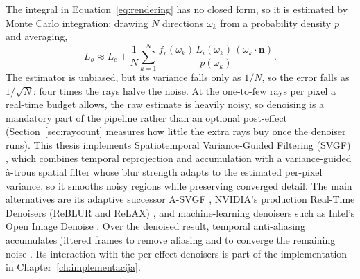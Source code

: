 The integral in Equation~\eqref{eq:rendering} has no closed form, so it is estimated by Monte Carlo
integration: drawing $N$ directions $\omega_k$ from a probability density $p$ and averaging,
\begin{equation}
L_o \approx L_e + \frac{1}{N}\sum_{k=1}^{N}
\frac{f_r(\omega_k)\, L_i(\omega_k)\, (\omega_k \cdot \mathbf{n})}{p(\omega_k)}.
\label{eq:mc}
\end{equation}
The estimator is unbiased, but its variance falls only as $1/N$, so the error falls as $1/\sqrt{N}$:
four times the rays halve the noise. At the one-to-few rays
per pixel a real-time budget allows, the raw estimate is heavily noisy, so denoising is a mandatory
part of the pipeline rather than an optional post-effect (Section~\ref{sec:raycount} measures how
little the extra rays buy once the denoiser runs). This thesis implements Spatiotemporal
Variance-Guided Filtering (SVGF) \cite{schied2017svgf}, which combines temporal reprojection and
accumulation with a variance-guided \`a-trous spatial filter whose blur strength adapts to the
estimated per-pixel variance, so it smooths noisy regions while preserving converged detail. The main
alternatives are its adaptive successor A-SVGF \cite{schied2018asvgf}, NVIDIA's production Real-Time
Denoisers (ReBLUR and ReLAX) \cite{nvidia_nrd}, and machine-learning denoisers such as Intel's Open
Image Denoise \cite{intel_oidn}. Over the denoised result, temporal anti-aliasing accumulates jittered
frames to remove aliasing and to converge the remaining noise \cite{karis2014taa}. Its interaction
with the per-effect denoisers is part of the implementation in Chapter~\ref{ch:implementacija}.
